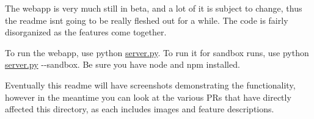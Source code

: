 The webapp is very much still in beta, and a lot of it is subject to change, thus the readme isn\textquotesingle{}t going to be really fleshed out for a while. The code is fairly disorganized as the features come together.

To run the webapp, use {\ttfamily python \hyperlink{server_8py}{server.\+py}}. To run it for sandbox runs, use {\ttfamily python \hyperlink{server_8py}{server.\+py} -\/-\/sandbox}. Be sure you have node and npm installed.

Eventually this readme will have screenshots demonstrating the functionality, however in the meantime you can look at the various P\+Rs that have directly affected this directory, as each includes images and feature descriptions. 